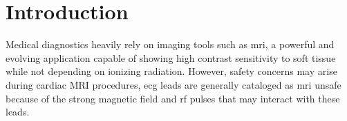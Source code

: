 

















\chapter {Introduction}

Medical diagnostics heavily rely on imaging tools such as \gls{mri}, a powerful and evolving application capable of showing high contrast sensitivity to soft tissue while not depending on ionizing radiation. However, safety concerns may arise during cardiac MRI procedures, \gls{ecg} leads are generally cataloged as  \gls{mri} unsafe because of the strong magnetic field and \gls{rf} pulses that may interact with these leads.

